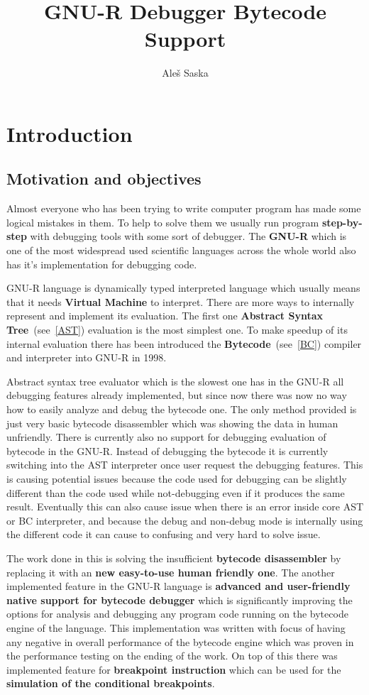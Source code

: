 \documentclass[thesis=M,english]{FITthesis}[2018/10/20]
\title{GNU-R Debugger Bytecode Support}
\author{Ale{\v s} Saska} %
\begin{document}

\chapter{Introduction}

\section{Motivation and objectives}

Almost everyone who has been trying to write computer program has made some logical mistakes in them. To help to solve them we usually run program \textbf{step-by-step} with debugging tools with some sort of debugger. The \mbox{\textbf{GNU-R}} which is one of the most widespread used scientific languages across the whole world also has it's implementation for debugging code.

GNU-R language is dynamically typed interpreted language which usually means that it needs \textbf{Virtual Machine} to interpret. There are more ways to internally represent and implement its evaluation. The first one \textbf{Abstract Syntax Tree}~(see~\ref{AST}) evaluation is the most simplest one. To make speedup of its internal evaluation there has been introduced the \textbf{Bytecode}~(see~\ref{BC}) compiler and interpreter into \mbox{GNU-R} in 1998.

Abstract syntax tree evaluator which is the slowest one has in the GNU-R all debugging features already implemented, but since now there was now no way how to easily analyze and debug the bytecode one. The only method provided is just very basic bytecode disassembler which was showing the data in human unfriendly. There is currently also no support for debugging evaluation of bytecode in the GNU-R. Instead of debugging the bytecode it is currently switching into the AST interpreter once user request the debugging features. This is causing potential issues because the code used for debugging can be slightly different than the code used while not-debugging even if it produces the same result. Eventually this can also cause issue when there is an error inside core AST or BC interpreter, and because the debug and non-debug mode is internally using the different code it can cause to confusing and very hard to solve issue.

The work done in this is solving the insufficient \textbf{bytecode disassembler} by replacing it with an \textbf{new easy-to-use human friendly one}. The another implemented feature in the GNU-R language is \textbf{advanced and user-friendly native support for bytecode debugger} which is significantly improving the options for analysis and debugging any program code running on the bytecode engine of the language. This implementation was written with focus of having any negative in overall performance of the bytecode engine which was proven in the performance testing on the ending of the work. On top of this there was implemented feature for \textbf{breakpoint instruction} which can be used for the \textbf{simulation of the conditional breakpoints}.
\end{document}
